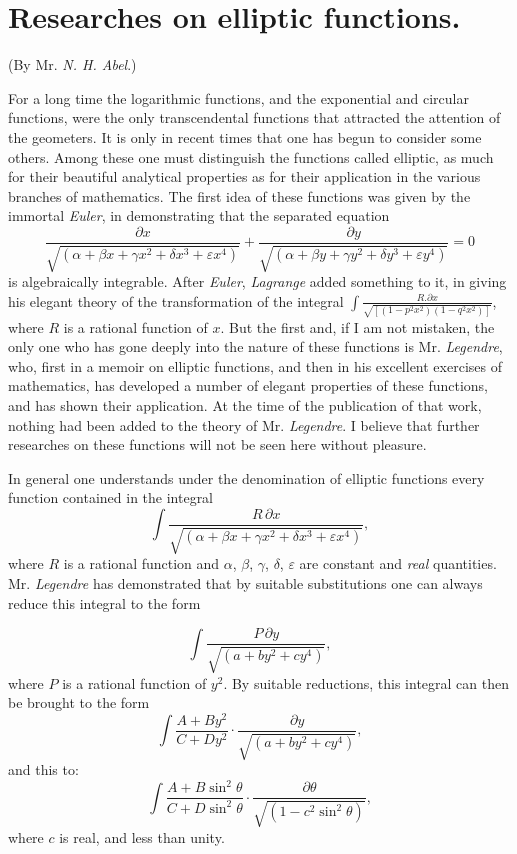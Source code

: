 \documentclass{article}
\begin{document}

\section*{Researches on elliptic functions.}

(By Mr. \emph{N. H. Abel}.)

For a long time the logarithmic functions, and the exponential and circular functions, were the only transcendental functions that attracted the attention of the geometers. It is only in recent times that one has begun to consider some others. Among these one must distinguish the functions called elliptic, as much for their beautiful analytical properties as for their application in the various branches of mathematics. The first idea of these functions was given by the immortal \emph{Euler}, in demonstrating that the separated equation
\[ \frac{\partial x}{\sqrt{(\alpha+\beta x+\gamma x^{2}+\delta x^{3}+\varepsilon x^{4})}}+\frac{\partial y}{\sqrt{(\alpha+\beta y+\gamma y^{2}+\delta y^{3}+\varepsilon y^{4})}}=0 \tag{1.} \]
is algebraically integrable. After \emph{Euler}, \emph{Lagrange} added something to it, in giving his elegant theory of the transformation of the integral $\displaystyle\int\frac{R.\partial x}{\sqrt{[(1-p^{2}x^{2})(1-q^{2}x^{2})]}}$, where $R$ is a rational function of $x$. But the first and, if I am not mistaken, the only one who has gone deeply into the nature of these functions is Mr. \emph{Legendre}, who, first in a memoir on elliptic functions, and then in his excellent exercises of mathematics, has developed a number of elegant properties of these functions, and has shown their application. At the time of the publication of that work, nothing had been added to the theory of Mr. \emph{Legendre}. I believe that further researches on these functions will not be seen here without pleasure.

In general one understands under the denomination of elliptic functions every function contained in the integral
\[ \int\frac{R\,\partial x}{\sqrt{(\alpha+\beta x+\gamma x^{2}+\delta x^{3}+\varepsilon x^{4})}}, \]
where $R$ is a rational function and $\alpha$, $\beta$, $\gamma$, $\delta$, $\varepsilon$ are constant and \emph{real} quantities. Mr. \emph{Legendre} has demonstrated that by suitable substitutions one can always reduce this integral to the form


\[ \int\frac{P\,\partial y}{\sqrt{(a+by^{2}+cy^{4})}}, \]
where $P$ is a rational function of $y^{2}$. By suitable reductions, this integral can then be brought to the form
\[ \int\frac{A+By^{2}}{C+Dy^{2}}\cdot\frac{\partial y}{\sqrt{(a+by^{2}+cy^{4})}}, \]
and this to:
\[ \int\frac{A+B\sin^{2}\theta}{C+D\sin^{2}\theta}\cdot\frac{\partial\theta}{\sqrt{(1-c^{2}\sin^{2}\theta)}}, \]
where $c$ is real, and less than unity.
\end{document}
